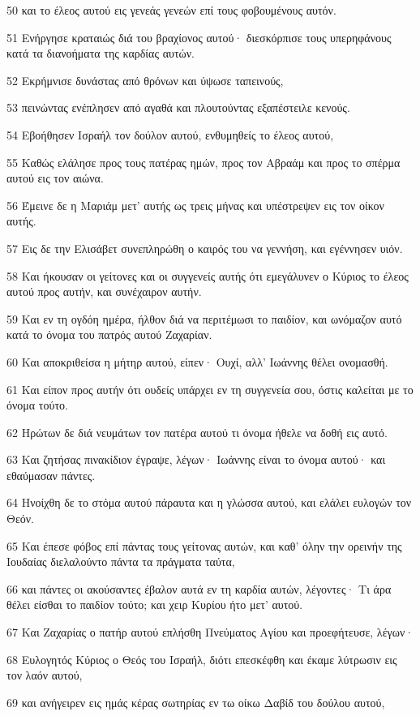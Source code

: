 \par 50 και το έλεος αυτού εις γενεάς γενεών επί τους φοβουμένους αυτόν.
\par 51 Ενήργησε κραταιώς διά του βραχίονος αυτού· διεσκόρπισε τους υπερηφάνους κατά τα διανοήματα της καρδίας αυτών.
\par 52 Εκρήμνισε δυνάστας από θρόνων και ύψωσε ταπεινούς,
\par 53 πεινώντας ενέπλησεν από αγαθά και πλουτούντας εξαπέστειλε κενούς.
\par 54 Εβοήθησεν Ισραήλ τον δούλον αυτού, ενθυμηθείς το έλεος αυτού,
\par 55 Καθώς ελάλησε προς τους πατέρας ημών, προς τον Αβραάμ και προς το σπέρμα αυτού εις τον αιώνα.
\par 56 Έμεινε δε η Μαριάμ μετ' αυτής ως τρεις μήνας και υπέστρεψεν εις τον οίκον αυτής.
\par 57 Εις δε την Ελισάβετ συνεπληρώθη ο καιρός του να γεννήση, και εγέννησεν υιόν.
\par 58 Και ήκουσαν οι γείτονες και οι συγγενείς αυτής ότι εμεγάλυνεν ο Κύριος το έλεος αυτού προς αυτήν, και συνέχαιρον αυτήν.
\par 59 Και εν τη ογδόη ημέρα, ήλθον διά να περιτέμωσι το παιδίον, και ωνόμαζον αυτό κατά το όνομα του πατρός αυτού Ζαχαρίαν.
\par 60 Και αποκριθείσα η μήτηρ αυτού, είπεν· Ουχί, αλλ' Ιωάννης θέλει ονομασθή.
\par 61 Και είπον προς αυτήν ότι ουδείς υπάρχει εν τη συγγενεία σου, όστις καλείται με το όνομα τούτο.
\par 62 Ηρώτων δε διά νευμάτων τον πατέρα αυτού τι όνομα ήθελε να δοθή εις αυτό.
\par 63 Και ζητήσας πινακίδιον έγραψε, λέγων· Ιωάννης είναι το όνομα αυτού· και εθαύμασαν πάντες.
\par 64 Ηνοίχθη δε το στόμα αυτού πάραυτα και η γλώσσα αυτού, και ελάλει ευλογών τον Θεόν.
\par 65 Και έπεσε φόβος επί πάντας τους γείτονας αυτών, και καθ' όλην την ορεινήν της Ιουδαίας διελαλούντο πάντα τα πράγματα ταύτα,
\par 66 και πάντες οι ακούσαντες έβαλον αυτά εν τη καρδία αυτών, λέγοντες· Τι άρα θέλει είσθαι το παιδίον τούτο; και χειρ Κυρίου ήτο μετ' αυτού.
\par 67 Και Ζαχαρίας ο πατήρ αυτού επλήσθη Πνεύματος Αγίου και προεφήτευσε, λέγων·
\par 68 Ευλογητός Κύριος ο Θεός του Ισραήλ, διότι επεσκέφθη και έκαμε λύτρωσιν εις τον λαόν αυτού,
\par 69 και ανήγειρεν εις ημάς κέρας σωτηρίας εν τω οίκω Δαβίδ του δούλου αυτού,
